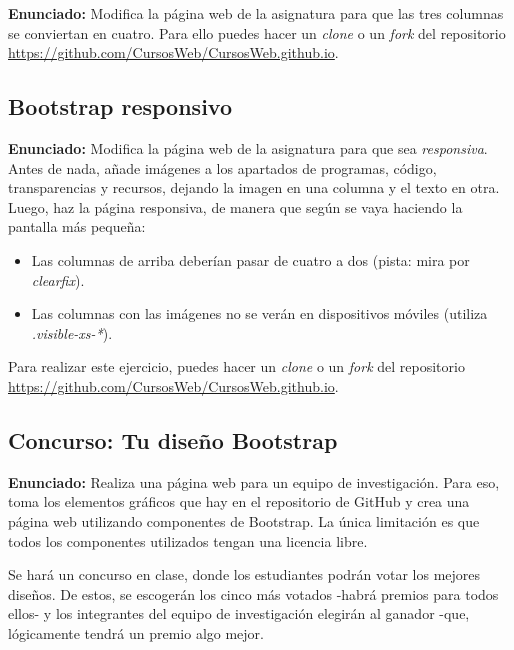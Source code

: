 \textbf{Enunciado:} Modifica la página web de la asignatura para que las tres columnas
se conviertan en cuatro. Para ello puedes hacer un \emph{clone} o un \emph{fork} del
repositorio \url{https://github.com/CursosWeb/CursosWeb.github.io}.


\subsection{Bootstrap responsivo}
\label{subsec:bootstrap-responsivo}

\textbf{Enunciado:} Modifica la página web de la asignatura para que sea \emph{responsiva}. Antes de nada, añade imágenes a los apartados de programas, código, transparencias y recursos, dejando la imagen en una columna y el texto en otra. Luego, haz la página responsiva, de manera que según se vaya haciendo la pantalla más pequeña:

\begin{itemize}
  \item Las columnas de arriba deberían pasar de cuatro a dos (pista: mira por \emph{clearfix}).
  \item Las columnas con las imágenes no se verán en dispositivos móviles (utiliza \emph{.visible-xs-*}).
\end{itemize}
   
   Para realizar este ejercicio, puedes hacer un \emph{clone} o un \emph{fork} del
repositorio \url{https://github.com/CursosWeb/CursosWeb.github.io}.

\subsection{Concurso: Tu diseño Bootstrap}
\label{subsec:concurso-bootstrap}

\textbf{Enunciado:} Realiza una página web para un equipo de investigación.
Para eso, toma los elementos gráficos que hay en el repositorio de
GitHub y crea una página web utilizando componentes de Bootstrap. La única
limitación es que todos los componentes utilizados tengan una licencia libre.

Se hará un concurso en clase, donde los estudiantes podrán votar los mejores
diseños. De estos, se escogerán los cinco más votados -habrá premios para todos
ellos- y los integrantes del equipo de investigación elegirán al ganador -que,
lógicamente tendrá un premio algo mejor.

